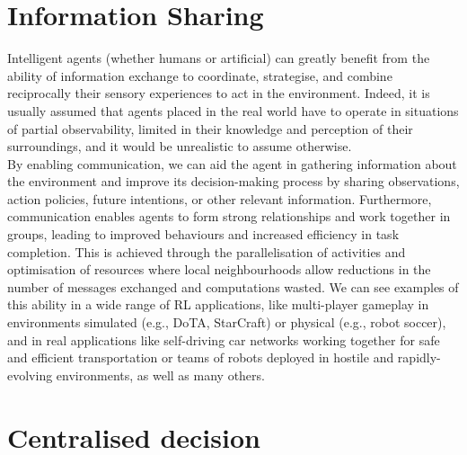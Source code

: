 \documentclass[a4paper,singleside,12pt]{report} %
\begin{document}
\section{Information Sharing}\label{information-sharing}

Intelligent agents (whether humans or artificial) can greatly benefit from the ability of information exchange to coordinate, strategise, and combine reciprocally their sensory experiences to act in the environment. Indeed, it is usually assumed that agents placed in the real world have to operate in situations of partial observability, limited in their knowledge and perception of their surroundings, and it would be unrealistic to assume otherwise.\\
By enabling communication, we can aid the agent in gathering information about the environment and improve its decision-making process by sharing observations, action policies, future intentions, or other relevant information. Furthermore, communication enables agents to form strong relationships and work together in groups, leading to improved behaviours and increased efficiency in task completion. This is achieved through the parallelisation of activities and optimisation of resources where local neighbourhoods allow reductions in the number of messages exchanged and computations wasted. We can see examples of this ability in a wide range of RL applications, like multi-player gameplay in environments simulated (e.g., DoTA, StarCraft) or physical (e.g., robot soccer), and in real applications like self-driving car networks working together for safe and efficient transportation or teams of robots deployed in hostile and rapidly-evolving environments, as well as many others.

\section{Centralised decision}\label{centralised-decision}
\end{document}
